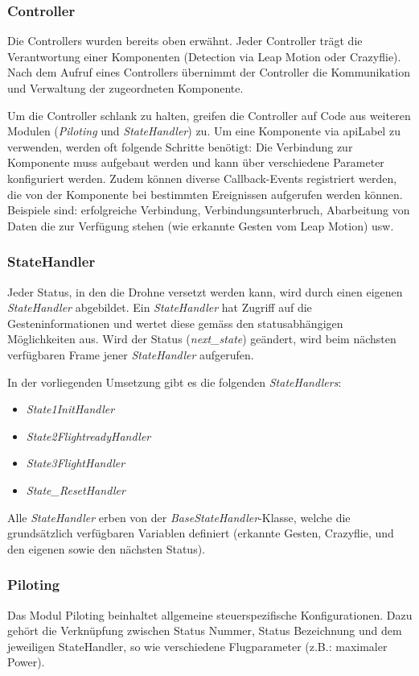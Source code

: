 \subsubsection{Controller}
Die Controllers wurden bereits oben erwähnt. Jeder Controller trägt die Verantwortung einer Komponenten (Detection via Leap Motion oder Crazyflie).
Nach dem Aufruf eines Controllers übernimmt der Controller die Kommunikation und Verwaltung der zugeordneten Komponente.

Um die Controller schlank zu halten, greifen die Controller auf Code aus weiteren Modulen (\textit{Piloting} und \textit{StateHandler}) zu.
Um eine Komponente via \gls{apiLabel} zu verwenden, werden oft folgende Schritte benötigt:
Die Verbindung zur Komponente muss aufgebaut werden und kann über verschiedene Parameter konfiguriert werden.
Zudem können diverse Callback-Events registriert werden, die von der Komponente bei bestimmten Ereignissen aufgerufen werden können. Beispiele sind: erfolgreiche Verbindung, Verbindungsunterbruch, Abarbeitung von Daten die zur Verfügung stehen (wie erkannte Gesten vom Leap Motion) usw.

\subsubsection{StateHandler}
Jeder Status, in den die Drohne versetzt werden kann, wird durch einen eigenen \textit{StateHandler} abgebildet.
Ein \textit{StateHandler} hat Zugriff auf die Gesteninformationen und wertet diese gemäss den statusabhängigen Möglichkeiten aus.
Wird der Status (\textit{next\_state}) geändert, wird beim nächsten verfügbaren Frame jener \textit{StateHandler} aufgerufen.

In der vorliegenden Umsetzung gibt es die folgenden \textit{StateHandlers}:
\begin{itemize}
	\item \textit{State1InitHandler}
	\item \textit{State2FlightreadyHandler}
	\item \textit{State3FlightHandler}
	\item \textit{State\_ResetHandler}
\end{itemize}
Alle \textit{StateHandler} erben von der \textit{BaseStateHandler}-Klasse, welche die grundsätzlich verfügbaren Variablen definiert (erkannte Gesten, Crazyflie, und den eigenen sowie den nächsten Status).

\subsubsection{Piloting}
Das Modul Piloting beinhaltet allgemeine steuerspezifische Konfigurationen.
Dazu gehört die Verknüpfung zwischen Status Nummer, Status Bezeichnung und dem jeweiligen StateHandler, so wie verschiedene Flugparameter (z.B.: maximaler Power).

